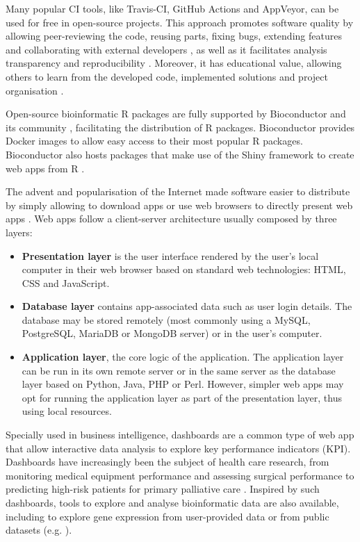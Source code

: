 Many popular CI tools, like Travis-CI, GitHub Actions and AppVeyor, can be used for free in open-source projects. This approach promotes software quality by allowing peer-reviewing the code, reusing parts, fixing bugs, extending features and collaborating with external developers \cite{silva:2017wl,hewitt:2019uj}, as well as it facilitates analysis transparency and reproducibility \cite{silva:2017wl}. Moreover, it has educational value, allowing others to learn from the developed code, implemented solutions and project organisation \cite{hewitt:2019uj}.

Open-source bioinformatic R packages are fully supported by Bioconductor and its community \cite{huber:2015wt}, facilitating the distribution of R packages. Bioconductor provides Docker images to allow easy access to their most popular R packages. Bioconductor also hosts packages that make use of the Shiny framework to create web apps from R \cite{chang:2021ul}.

The advent and popularisation of the Internet made software easier to distribute by simply allowing to download apps or use web browsers to directly present web apps \cite{}. Web apps follow a client-server architecture usually composed by three layers:
\begin{itemize}
	\item \textbf{Presentation layer} is the user interface rendered by the user's local computer in their web browser based on standard web technologies: HTML, CSS and JavaScript.
	\item \textbf{Database layer} contains app-associated data such as user login details. The database may be stored remotely (most commonly using a MySQL, PostgreSQL, MariaDB or MongoDB server) or in the user's computer.
	\item \textbf{Application layer}, the core logic of the application. The application layer can be run in its own remote server or in the same server as the database layer based on Python, Java, PHP or Perl. However, simpler web apps may opt for running the application layer as part of the presentation layer, thus using local resources.
\end{itemize}

Specially used in business intelligence, dashboards are a common type of web app that allow interactive data analysis to explore key performance indicators (KPI). Dashboards have increasingly been the subject of health care research, from monitoring medical equipment performance \cite{iadanza:2019tj} and assessing surgical performance \cite{baghdadi:2021uc} to predicting high-risk patients for primary palliative care \cite{tan:2020tu}. Inspired by such dashboards, tools to explore and analyse bioinformatic data are also available, including to explore gene expression from user-provided data or from public datasets (e.g. \cite{reyes:2019ud,cardoso-moreira:2019wd}).

